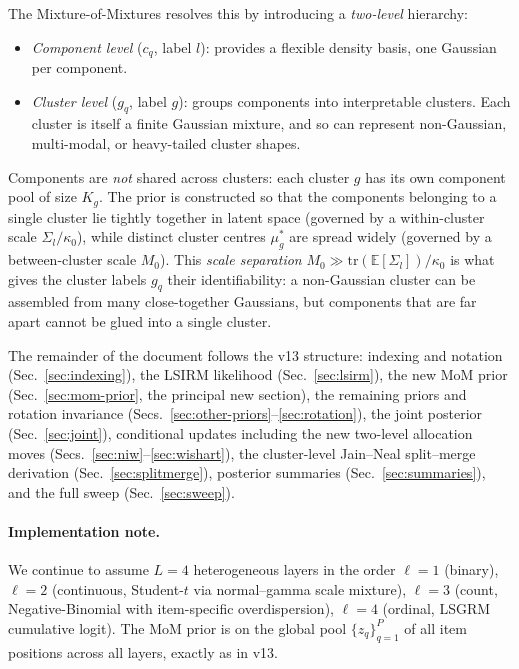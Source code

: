 \documentclass[11pt]{article}
\newcommand{\tr}{\mathrm{tr}}
\begin{document}
The Mixture-of-Mixtures resolves this by introducing a \emph{two-level}
hierarchy:
\begin{itemize}
\item \emph{Component level} ($c_q$, label $l$): provides a flexible
      density basis, one Gaussian per component.
\item \emph{Cluster level} ($g_q$, label $g$): groups components into
      interpretable clusters. Each cluster is itself a finite Gaussian
      mixture, and so can represent non-Gaussian, multi-modal, or
      heavy-tailed cluster shapes.
\end{itemize}
Components are \emph{not} shared across clusters: each cluster $g$ has its
own component pool of size $K_g$. The prior is constructed so that the
components belonging to a single cluster lie tightly together in latent
space (governed by a within-cluster scale $\Sigma_l/\kappa_0$), while
distinct cluster centres $\mu_g^*$ are spread widely (governed by a
between-cluster scale $M_0$). This \emph{scale separation}
$M_0 \gg \tr(\mathbb{E}[\Sigma_l])/\kappa_0$ is what gives the cluster
labels $g_q$ their identifiability: a non-Gaussian cluster can be assembled
from many close-together Gaussians, but components that are far apart
cannot be glued into a single cluster.

The remainder of the document follows the v13 structure: indexing and
notation (Sec.~\ref{sec:indexing}), the LSIRM likelihood
(Sec.~\ref{sec:lsirm}), the new MoM prior (Sec.~\ref{sec:mom-prior},
the principal new section), the remaining priors and rotation invariance
(Secs.~\ref{sec:other-priors}--\ref{sec:rotation}), the joint posterior
(Sec.~\ref{sec:joint}), conditional updates including the new
two-level allocation moves (Secs.~\ref{sec:niw}--\ref{sec:wishart}),
the cluster-level Jain--Neal split--merge derivation
(Sec.~\ref{sec:splitmerge}), posterior summaries
(Sec.~\ref{sec:summaries}), and the full sweep
(Sec.~\ref{sec:sweep}).

\paragraph{Implementation note.}
We continue to assume $L=4$ heterogeneous layers in the order
$\ell=1$ (binary), $\ell=2$ (continuous, Student-$t$ via normal--gamma
scale mixture), $\ell=3$ (count, Negative-Binomial with item-specific
overdispersion), $\ell=4$ (ordinal, LSGRM cumulative logit). The MoM
prior is on the global pool $\{z_q\}_{q=1}^P$ of all item positions
across all layers, exactly as in v13.
\end{document}
